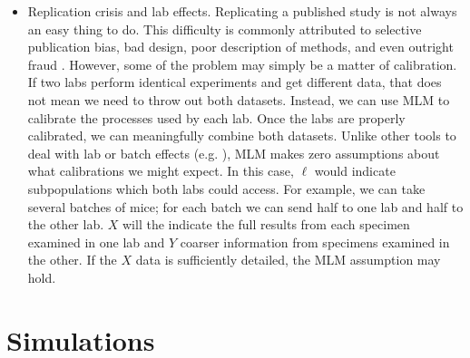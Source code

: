 \begin{itemize}
    \item Replication crisis and lab effects.  Replicating a published study is not always an easy thing to do.  This difficulty is commonly attributed to selective publication bias, bad design, poor description of methods, and even outright fraud \cite{baker2016reproducibility}.  However, some of the problem may simply be a matter of calibration.  If two labs perform identical experiments and get different data, that does not mean we need to throw out both datasets.  Instead, we can use MLM to calibrate the processes used by each lab.  Once the labs are properly calibrated, we can meaningfully combine both datasets.  Unlike other tools to deal with lab or batch effects (e.g. \cite{crow2018characterizing,johnson2007adjusting}), MLM makes zero assumptions about what calibrations we might expect.  In this case, $\ell$ would indicate subpopulations which both labs could access.  For example, we can take several batches of mice; for each batch we can send half to one lab and half to the other lab.  $X$ will the indicate the full results from each specimen examined in one lab and $Y$ coarser information from specimens examined in the other.  If the $X$ data is sufficiently detailed, the MLM assumption may hold.  
\end{itemize}

%                                                    

\section{Simulations}

\label{sec:simulations}


